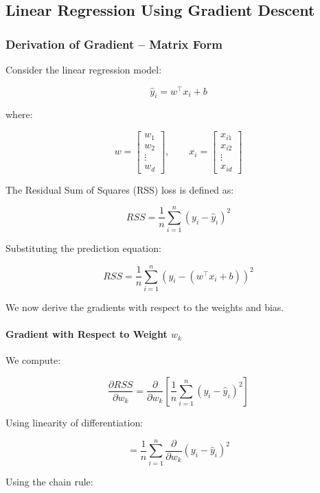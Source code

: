 \documentclass[10pt,a4paper]{article}
\begin{document}
	\subsection{Linear Regression Using Gradient Descent}

	\subsubsection{Derivation of Gradient -- Matrix Form}
	
	Consider the linear regression model:
	
	\[
	\hat{y}_i = w^\top x_i + b
	\]
	
	where:
	
	\[
	w =
	\begin{bmatrix}
	w_1 \\
	w_2 \\
	\vdots \\
	w_d
	\end{bmatrix},
	\qquad
	x_i =
	\begin{bmatrix}
	x_{i1} \\
	x_{i2} \\
	\vdots \\
	x_{id}
	\end{bmatrix}
	\]
	
	The Residual Sum of Squares (RSS) loss is defined as:
	
	\[
	RSS = \frac{1}{n}\sum_{i=1}^{n}(y_i - \hat{y}_i)^2
	\]
	
	Substituting the prediction equation:
	
	\[
	RSS
	=
	\frac{1}{n}
	\sum_{i=1}^{n}
	\left(
	y_i - (w^\top x_i + b)
	\right)^2
	\]
	
	We now derive the gradients with respect to the weights and bias.
	
	\paragraph{Gradient with Respect to Weight \(w_k\)}
	
	We compute:
	
	\[
	\frac{\partial RSS}{\partial w_k}
	=
	\frac{\partial}{\partial w_k}
	\left[
	\frac{1}{n}
	\sum_{i=1}^{n}
	(y_i - \hat{y}_i)^2
	\right]
	\]
	
	Using linearity of differentiation:
	
	\[
	=
	\frac{1}{n}
	\sum_{i=1}^{n}
	\frac{\partial}{\partial w_k}
	(y_i - \hat{y}_i)^2
	\]
	
	Using the chain rule:
	
\end{document}
